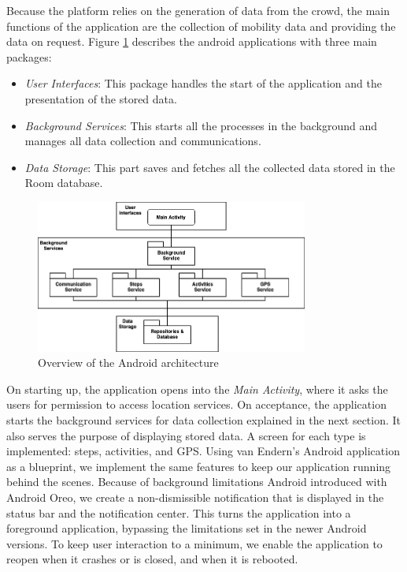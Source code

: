 Because the platform relies on the generation of data from the crowd, the main functions of the application are the collection of mobility data and providing the data on request. Figure \ref{fig:modules} describes the android applications with three main packages:

\begin{itemize}
    \item \textit{User Interfaces}: This package handles the start of the application and the presentation of the stored data.
    \item \textit{Background Services}: This starts all the processes in the background and manages all data collection and communications.
    \item \textit{Data Storage}: This part saves and fetches all the collected data stored in the Room database.
\end{itemize}

\begin{figure}[htpb]
  \centering
  \includegraphics[width=0.8\textwidth]{figures/modules}
  \caption{Overview of the Android architecture} \label{fig:modules}
\end{figure}

On starting up, the application opens into the \textit{Main Activity}, where it asks the users for permission to access location services. On acceptance, the application starts the background services for data collection explained in the next section. It also serves the purpose of displaying stored data. A screen for each type is implemented: steps, activities, and GPS. Using van Endern's Android application as a blueprint, we implement the same features to keep our application running behind the scenes. Because of background limitations Android introduced with Android Oreo, we create a non-dismissible notification that is displayed in the status bar and the notification center. This turns the application into a foreground application, bypassing the limitations set in the newer Android versions. To keep user interaction to a minimum, we enable the application to reopen when it crashes or is closed, and when it is rebooted.

